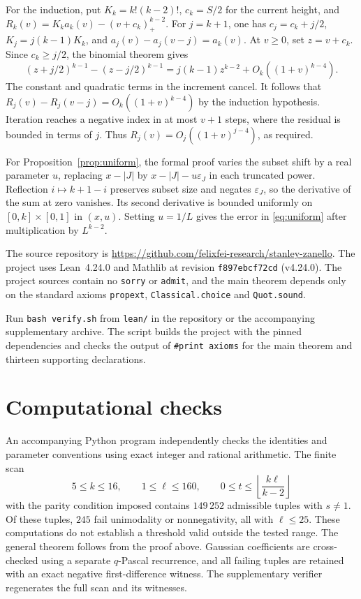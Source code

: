 \documentclass[3p,11pt,number]{elsarticle}
\theoremstyle{remark}
\numberwithin{equation}{section}
\begin{document}
For the induction, put \(K_k=k!(k-2)!\), \(c_k=S/2\) for the current
height, and \(R_k(v)=K_ka_k(v)-(v+c_k)_+^{k-2}\).
For \(j=k+1\), one has \(c_j=c_k+j/2\),
\(K_j=j(k-1)K_k\), and \(a_j(v)-a_j(v-j)=a_k(v)\).
At \(v\ge0\), set \(z=v+c_k\). Since \(c_k\ge j/2\), the
binomial theorem gives
\[
 (z+j/2)^{k-1}-(z-j/2)^{k-1}
      =j(k-1)z^{k-2}+O_k((1+v)^{k-4}).
\]
The constant and quadratic terms in the increment cancel.
It follows that \(R_j(v)-R_j(v-j)=O_k((1+v)^{k-4})\) by the
induction hypothesis. Iteration reaches a negative index in at
most \(v+1\) steps, where the residual is bounded in terms of \(j\).
Thus \(R_j(v)=O_j((1+v)^{j-4})\), as required.

For Proposition~\ref{prop:uniform}, the formal proof varies the
subset shift by a real parameter \(u\), replacing \(x-|J|\) by
\(x-|J|-u\varepsilon_J\) in each truncated power. Reflection
\(i\mapsto k+1-i\) preserves subset size and negates
\(\varepsilon_J\), so the derivative of the sum at zero vanishes.
Its second derivative is bounded uniformly on
\([0,k]\times[0,1]\) in \((x,u)\). Setting \(u=1/L\) gives
the error in \eqref{eq:uniform} after multiplication by \(L^{k-2}\).

The source repository is \url{https://github.com/felixfei-research/stanley-zanello}.
The project uses Lean~4.24.0 and Mathlib at revision
\texttt{f897ebcf72cd} (v4.24.0).
The project sources contain no \texttt{sorry} or \texttt{admit}, and the
main theorem depends only on the standard axioms \texttt{propext},
\texttt{Classical.choice} and \texttt{Quot.sound}.


Run \texttt{bash verify.sh} from
\texttt{lean/} in the repository or the accompanying supplementary archive. The script builds the project
with the pinned dependencies and checks the output of \texttt{\#print axioms}
for the main theorem and thirteen supporting declarations.

\section{Computational checks}

An accompanying Python program independently checks the identities and parameter
conventions using exact integer and rational arithmetic.
The finite scan
\[
5\le k\le16,\qquad 1\le\ell\le160,
\qquad 0\le t\le\left\lfloor\frac{k\ell}{k-2}\right\rfloor
\]
with the parity condition imposed contains \(149\,252\) admissible
tuples with \(s\ne1\).
Of these tuples, \(245\) fail unimodality or nonnegativity, all with
\(\ell\le25\). These computations do not establish a threshold valid outside the tested range. The general theorem follows from the proof above. Gaussian coefficients are cross-checked using a
separate \(q\)-Pascal recurrence, and all failing tuples are retained
with an exact negative first-difference witness.
The supplementary verifier regenerates the full scan and its witnesses.
\end{document}
